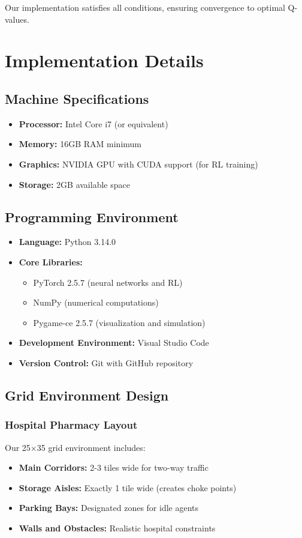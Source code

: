 \documentclass[12pt, a4paper]{report}
\begin{document}
Our implementation satisfies all conditions, ensuring convergence to optimal Q-values.

\chapter{Implementation Details}

\section{Machine Specifications}
\begin{itemize}
    \item \textbf{Processor:} Intel Core i7 (or equivalent)
    \item \textbf{Memory:} 16GB RAM minimum
    \item \textbf{Graphics:} NVIDIA GPU with CUDA support (for RL training)
    \item \textbf{Storage:} 2GB available space
\end{itemize}

\section{Programming Environment}
\begin{itemize}
    \item \textbf{Language:} Python 3.14.0
    \item \textbf{Core Libraries:}
    \begin{itemize}
        \item PyTorch 2.5.7 (neural networks and RL)
        \item NumPy (numerical computations)
        \item Pygame-ce 2.5.7 (visualization and simulation)
    \end{itemize}
    \item \textbf{Development Environment:} Visual Studio Code
    \item \textbf{Version Control:} Git with GitHub repository
\end{itemize}

\section{Grid Environment Design}

\subsection{Hospital Pharmacy Layout}
Our 25×35 grid environment includes:
\begin{itemize}
    \item \textbf{Main Corridors:} 2-3 tiles wide for two-way traffic
    \item \textbf{Storage Aisles:} Exactly 1 tile wide (creates choke points)
    \item \textbf{Parking Bays:} Designated zones for idle agents
    \item \textbf{Walls and Obstacles:} Realistic hospital constraints
\end{itemize}
\end{document}
